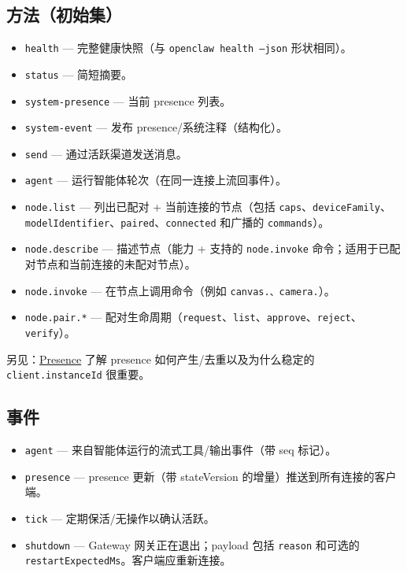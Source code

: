 \subsection{方法（初始集）}


\begin{itemize}
  \item \texttt{health} — 完整健康快照（与 \texttt{openclaw health --json} 形状相同）。
  \item \texttt{status} — 简短摘要。
  \item \texttt{system-presence} — 当前 presence 列表。
  \item \texttt{system-event} — 发布 presence/系统注释（结构化）。
  \item \texttt{send} — 通过活跃渠道发送消息。
  \item \texttt{agent} — 运行智能体轮次（在同一连接上流回事件）。
  \item \texttt{node.list} — 列出已配对 + 当前连接的节点（包括 \texttt{caps}、\texttt{deviceFamily}、\texttt{modelIdentifier}、\texttt{paired}、\texttt{connected} 和广播的 \texttt{commands}）。
  \item \texttt{node.describe} — 描述节点（能力 + 支持的 \texttt{node.invoke} 命令；适用于已配对节点和当前连接的未配对节点）。
  \item \texttt{node.invoke} — 在节点上调用命令（例如 \texttt{canvas.\textit{}、\texttt{camera.}}）。
  \item \texttt{node.pair.*} — 配对生命周期（\texttt{request}、\texttt{list}、\texttt{approve}、\texttt{reject}、\texttt{verify}）。
\end{itemize}


另见：\href{/concepts/presence}{Presence} 了解 presence 如何产生/去重以及为什么稳定的 \texttt{client.instanceId} 很重要。

\subsection{事件}


\begin{itemize}
  \item \texttt{agent} — 来自智能体运行的流式工具/输出事件（带 seq 标记）。
  \item \texttt{presence} — presence 更新（带 stateVersion 的增量）推送到所有连接的客户端。
  \item \texttt{tick} — 定期保活/无操作以确认活跃。
  \item \texttt{shutdown} — Gateway 网关正在退出；payload 包括 \texttt{reason} 和可选的 \texttt{restartExpectedMs}。客户端应重新连接。
\end{itemize}


